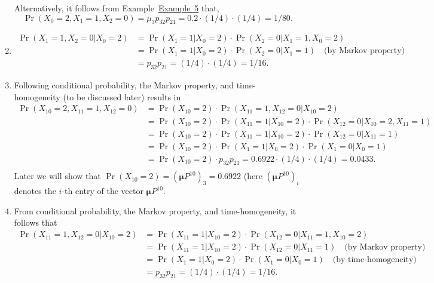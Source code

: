 \documentclass[
]{book}
\theoremstyle{definition}
\theoremstyle{definition}
\theoremstyle{definition}
\theoremstyle{definition}
\theoremstyle{remark}
\begin{document}
\begin{enumerate}
  Alternatively, it follows from
  Example~\protect\hyperlink{MKProperty1}{Example~5} that,
  \[\Pr(X_0 = 2, X_1 = 1, X_2 = 0) = \mu_3 p_{32} p_{21} = 0.2\cdot(1/4)\cdot(1/4) = 1/80.\]
\item
  \[\begin{aligned}
  \Pr( X_1 = 1, X_2 = 0 | X_0 = 2)
  &=   \Pr( X_1 = 1 | X_0 = 2)  \cdot \Pr( X_2 = 0 | X_1 = 1, X_0 = 2) \\
  &=   \Pr( X_1 = 1 | X_0 = 2) \cdot \Pr( X_2 = 0 | X_1 = 1) \quad \text{(by Markov property)}\\
  &= p_{32} p_{21} = (1/4)\cdot(1/4) = 1/16.\end{aligned}\]
\item
  Following conditional probability, the Markov property, and
  time-homogeneity (to be discussed later) results in
  \[\begin{aligned}
      \Pr(X_{10} = 2, X_{11} = 1, X_{12} = 0) &=  \Pr(X_{10} = 2)  \cdot \Pr(X_{11} = 1, X_{12} = 0 | X_{10} = 2) \\
       &=  \Pr(X_{10} = 2)  \cdot \Pr(X_{11} = 1 | X_{10} = 2) \cdot \Pr( X_{12} = 0 | X_{10} = 2, X_{11} = 1)  \\
       &=  \Pr(X_{10} = 2)  \cdot \Pr(X_{11} = 1 | X_{10} = 2) \cdot \Pr( X_{12} = 0 |  X_{11} = 1)  \\
       &= \Pr(X_{10} = 2)  \cdot \Pr(X_{1} = 1 | X_{0} = 2) \cdot \Pr( X_{1} = 0 |  X_{0} = 1) \\
        &= \Pr(X_{10} = 2)  \cdot p_{32} p_{21} = 0.6922\cdot (1/4)\cdot(1/4) = 0.0433.  \\\end{aligned}\]
  Later we will show that
  \(\Pr(X_{10} = 2) = (\boldsymbol{\mu} P^{10})_3 = 0.6922\) (here
  \((\boldsymbol{\mu} P^{10})_i\) denotes the \(i\)-th entry of the vector
  \(\boldsymbol{\mu} P^{10}\).
\item
  From conditional probability, the Markov property, and
  time-homogeneity, it follows that \[\begin{aligned}
  \Pr( X_{11} = 1, X_{12} = 0 | X_{10} = 2)
  &=   \Pr( X_{11} = 1 | X_{10} = 2)  \cdot \Pr( X_{12} = 0 | X_{11} = 1, X_{10} = 2) \\
  &=   \Pr( X_{11} = 1 | X_{10} = 2) \cdot \Pr( X_{12} = 0 | X_{11} = 1) \quad \text{(by Markov property)}\\
  &=   \Pr( X_{1} = 1 | X_{0} = 2) \cdot \Pr( X_{1} = 0 | X_{0} = 1) \quad \text{(by time-homogeneity)}\\
  &= p_{32} p_{21} = (1/4)\cdot(1/4) = 1/16.\end{aligned}\]
\end{enumerate}
\end{document}
